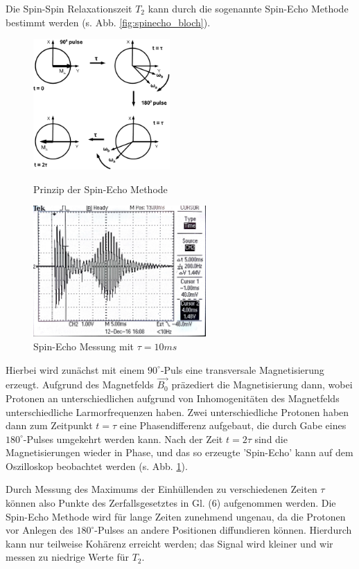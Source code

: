 \documentclass[a4paper]{scrartcl} %
\begin{document}
Die Spin-Spin Relaxationszeit $T_2$ kann durch die sogenannte Spin-Echo Methode bestimmt werden (s. Abb. \ref{fig:spinecho_bloch}).
\begin{figure}[!htb]
	\centering
	\parbox{70mm}{
		\centering
		\includegraphics[height=50mm]{./Resources/spin_ech_schematic.png}
		\caption{Prinzip der Spin-Echo Methode \autocite{skript}}
		\label{fig:spinecho_bloch}
	}
	\hspace*{\fill}
	\parbox{70mm}{
		\centering
		\includegraphics[height=50mm]{./Resources/spinecho_osci.jpg}
		\caption{Spin-Echo Messung mit $\tau=10ms$}
		\label{fig:spinecho_osci}
	}
\end{figure}

Hierbei wird zunächst mit einem $90^\circ$-Puls eine transversale Magnetisierung erzeugt. Aufgrund des Magnetfelds $\vec{B_0}$ präzediert die Magnetisierung dann, wobei Protonen an unterschiedlichen aufgrund von Inhomogenitäten des Magnetfelds unterschiedliche Larmorfrequenzen haben. Zwei unterschiedliche Protonen haben dann zum Zeitpunkt $t=\tau$ eine Phasendifferenz aufgebaut, die durch Gabe eines $180^\circ$-Pulses umgekehrt werden kann. Nach der Zeit $t=2\tau$ sind die Magnetisierungen wieder in Phase, und das so erzeugte 'Spin-Echo' kann auf dem Oszilloskop beobachtet werden (s. Abb. \ref{fig:spinecho_osci}).

Durch Messung des Maximums der Einhüllenden zu verschiedenen Zeiten $\tau$ können also Punkte des Zerfallsgesetztes in Gl. (6) aufgenommen werden. 
Die Spin-Echo Methode wird für lange Zeiten zunehmend ungenau, da die Protonen vor Anlegen des $180^\circ$-Pulses an andere Positionen diffundieren können. Hierdurch kann nur teilweise Kohärenz erreicht werden; das Signal wird kleiner und wir messen zu niedrige Werte für $T_2$.
\end{document}

